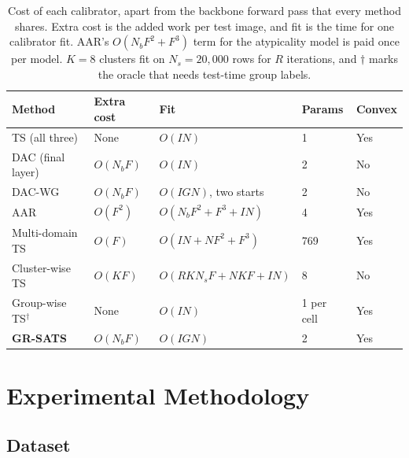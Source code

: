 \documentclass[sigconf,nonacm]{acmart}
\begin{document}
\begin{table}[t]
  \caption{Cost of each calibrator, apart from the backbone forward pass that every method shares. Extra cost is the added work per test image, and fit is the time for one calibrator fit. AAR's $O(N_b F^2 + F^3)$ term for the atypicality model is paid once per model. $K = 8$ clusters fit on $N_s = 20{,}000$ rows for $R$ iterations, and $\dagger$ marks the oracle that needs test-time group labels.}
  \label{tab:complexity}
  \scriptsize
  \setlength{\tabcolsep}{3pt}
  \renewcommand{\arraystretch}{1.1}
  \begin{tabularx}{\columnwidth}{@{}P{1.9cm}P{1.25cm}LP{0.85cm}P{0.75cm}@{}}
    \toprule
    \textbf{Method} & \textbf{Extra cost} & \textbf{Fit} & \textbf{Params} & \textbf{Convex} \\
    \midrule
    TS (all three) & None & $O(IN)$ & 1 & Yes \\
    DAC (final layer) & $O(N_b F)$ & $O(IN)$ & 2 & No \\
    DAC-WG & $O(N_b F)$ & $O(IGN)$, two starts & 2 & No \\
    AAR & $O(F^2)$ & $O(N_b F^2 + F^3 + IN)$ & 4 & Yes \\
    Multi-domain TS & $O(F)$ & $O(IN + NF^2 + F^3)$ & 769 & Yes \\
    Cluster-wise TS & $O(KF)$ & $O(R K N_s F + NKF + IN)$ & 8 & No \\
    Group-wise TS$^\dagger$ & None & $O(IN)$ & 1 per cell & Yes \\
    \textbf{GR-SATS} & $O(N_b F)$ & $O(IGN)$ & 2 & Yes \\
    \bottomrule
  \end{tabularx}
\end{table}

\section{Experimental Methodology}
\label{sec:experiments}

\subsection{Dataset}
\label{sec:data}
\end{document}
